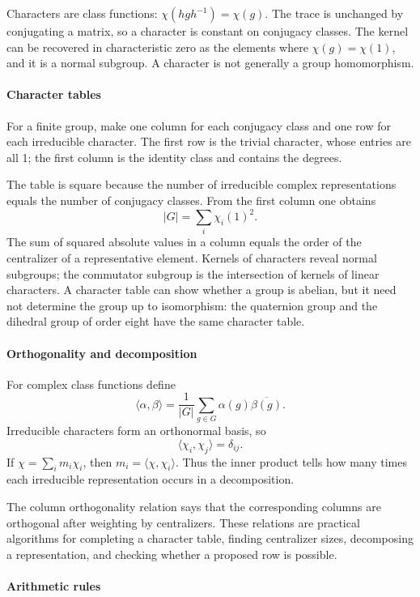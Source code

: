 Characters are class functions: $\chi(hgh^{-1})=\chi(g)$. The trace is unchanged by conjugating a matrix, so a character is constant on conjugacy classes. The kernel can be recovered in characteristic zero as the elements where $\chi(g)=\chi(1)$, and it is a normal subgroup. A character is not generally a group homomorphism.

\paragraph{Character tables}

For a finite group, make one column for each conjugacy class and one row for each irreducible character. The first row is the trivial character, whose entries are all 1; the first column is the identity class and contains the degrees.

The table is square because the number of irreducible complex representations equals the number of conjugacy classes. From the first column one obtains
\[
 |G|=\sum_i \chi_i(1)^2.
\]
The sum of squared absolute values in a column equals the order of the centralizer of a representative element. Kernels of characters reveal normal subgroups; the commutator subgroup is the intersection of kernels of linear characters. A character table can show whether a group is abelian, but it need not determine the group up to isomorphism: the quaternion group and the dihedral group of order eight have the same character table.

\paragraph{Orthogonality and decomposition}

For complex class functions define
\[
 \langle\alpha,\beta\rangle=
 \frac1{|G|}\sum_{g\in G}\alpha(g)\overline{\beta(g)}.
\]
Irreducible characters form an orthonormal basis, so
\[
 \langle\chi_i,\chi_j\rangle=\delta_{ij}.
\]
If $\chi=\sum_i m_i\chi_i$, then $m_i=\langle\chi,\chi_i\rangle$. Thus the inner product tells how many times each irreducible representation occurs in a decomposition.

The column orthogonality relation says that the corresponding columns are orthogonal after weighting by centralizers. These relations are practical algorithms for completing a character table, finding centralizer sizes, decomposing a representation, and checking whether a proposed row is possible.

\paragraph{Arithmetic rules}

